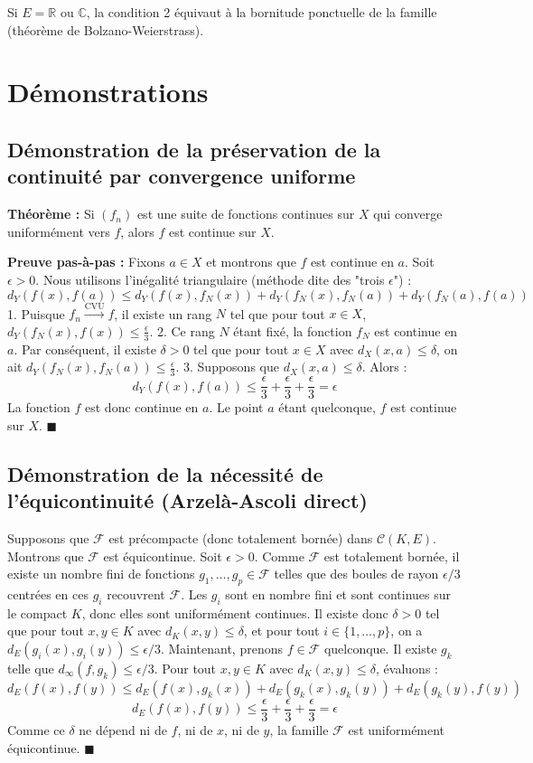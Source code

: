 \documentclass[11pt,a4paper]{article}
\begin{document}
Si $E = \mathbb{R}$ ou $\mathbb{C}$, la condition 2 équivaut à la bornitude ponctuelle de la famille (théorème de Bolzano-Weierstrass).

\section{Démonstrations}

\subsection*{Démonstration de la préservation de la continuité par convergence uniforme}

\textbf{Théorème :} Si $(f_n)$ est une suite de fonctions continues sur $X$ qui converge uniformément vers $f$, alors $f$ est continue sur $X$.

\textbf{Preuve pas-à-pas :}
Fixons $a \in X$ et montrons que $f$ est continue en $a$. Soit $\epsilon > 0$.
Nous utilisons l'inégalité triangulaire (méthode dite des "trois $\epsilon$") :
$$ d_Y(f(x), f(a)) \le d_Y(f(x), f_N(x)) + d_Y(f_N(x), f_N(a)) + d_Y(f_N(a), f(a)) $$
1. Puisque $f_n \xrightarrow{\text{CVU}} f$, il existe un rang $N$ tel que pour tout $x \in X$, $d_Y(f_N(x), f(x)) \le \frac{\epsilon}{3}$.
2. Ce rang $N$ étant fixé, la fonction $f_N$ est continue en $a$. Par conséquent, il existe $\delta > 0$ tel que pour tout $x \in X$ avec $d_X(x, a) \le \delta$, on ait $d_Y(f_N(x), f_N(a)) \le \frac{\epsilon}{3}$.
3. Supposons que $d_X(x, a) \le \delta$. Alors :
$$ d_Y(f(x), f(a)) \le \frac{\epsilon}{3} + \frac{\epsilon}{3} + \frac{\epsilon}{3} = \epsilon $$
La fonction $f$ est donc continue en $a$. Le point $a$ étant quelconque, $f$ est continue sur $X$. $\blacksquare$

\subsection*{Démonstration de la nécessité de l'équicontinuité (Arzelà-Ascoli direct)}

Supposons que $\mathcal{F}$ est précompacte (donc totalement bornée) dans $\mathcal{C}(K, E)$. Montrons que $\mathcal{F}$ est équicontinue.
Soit $\epsilon > 0$. Comme $\mathcal{F}$ est totalement bornée, il existe un nombre fini de fonctions $g_1, \dots, g_p \in \mathcal{F}$ telles que des boules de rayon $\epsilon/3$ centrées en ces $g_i$ recouvrent $\mathcal{F}$.
Les $g_i$ sont en nombre fini et sont continues sur le compact $K$, donc elles sont uniformément continues. Il existe donc $\delta > 0$ tel que pour tout $x, y \in K$ avec $d_K(x,y) \le \delta$, et pour tout $i \in \{1,\dots,p\}$, on a $d_E(g_i(x), g_i(y)) \le \epsilon/3$.
Maintenant, prenons $f \in \mathcal{F}$ quelconque. Il existe $g_k$ telle que $d_\infty(f, g_k) \le \epsilon/3$.
Pour tout $x, y \in K$ avec $d_K(x, y) \le \delta$, évaluons :
$$ d_E(f(x), f(y)) \le d_E(f(x), g_k(x)) + d_E(g_k(x), g_k(y)) + d_E(g_k(y), f(y)) $$
$$ d_E(f(x), f(y)) \le \frac{\epsilon}{3} + \frac{\epsilon}{3} + \frac{\epsilon}{3} = \epsilon $$
Comme ce $\delta$ ne dépend ni de $f$, ni de $x$, ni de $y$, la famille $\mathcal{F}$ est uniformément équicontinue. $\blacksquare$
\end{document}
